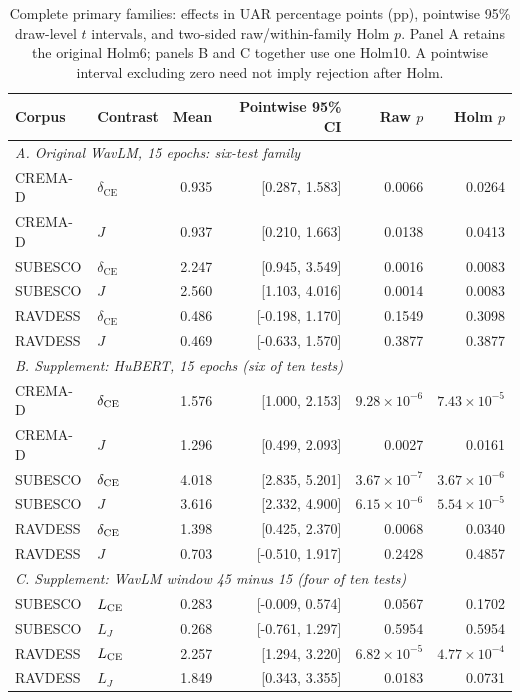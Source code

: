 \documentclass[letterpaper]{article}
\begin{document}
\begin{table}[t]
\centering\small
\caption{Complete primary families: effects in UAR percentage points (pp), pointwise 95\% draw-level $t$ intervals, and two-sided raw/within-family Holm $p$. Panel A retains the original Holm6; panels B and C together use one Holm10. A pointwise interval excluding zero need not imply rejection after Holm.}
\label{tab:primary}
\setlength{\tabcolsep}{5pt}
\begin{tabular}{llrrrr}\toprule
Corpus & Contrast & Mean & Pointwise 95\% CI & Raw $p$ & Holm $p$\\\midrule
\multicolumn{6}{l}{\textit{A. Original WavLM, 15 epochs: six-test family}}\\
CREMA-D & $\delta_{\mathrm{CE}}$ & 0.935 & [0.287, 1.583] & 0.0066 & 0.0264\\
CREMA-D & $J$ & 0.937 & [0.210, 1.663] & 0.0138 & 0.0413\\
SUBESCO & $\delta_{\mathrm{CE}}$ & 2.247 & [0.945, 3.549] & 0.0016 & 0.0083\\
SUBESCO & $J$ & 2.560 & [1.103, 4.016] & 0.0014 & 0.0083\\
RAVDESS & $\delta_{\mathrm{CE}}$ & 0.486 & [-0.198, 1.170] & 0.1549 & 0.3098\\
RAVDESS & $J$ & 0.469 & [-0.633, 1.570] & 0.3877 & 0.3877\\\midrule
\multicolumn{6}{l}{\textit{B. Supplement: HuBERT, 15 epochs (six of ten tests)}}\\
CREMA-D & $\delta_{\rm CE}$ & 1.576 & [1.000, 2.153] & $9.28\!\times\!10^{-6}$ & $7.43\!\times\!10^{-5}$\\
CREMA-D & $J$ & 1.296 & [0.499, 2.093] & 0.0027 & 0.0161\\
SUBESCO & $\delta_{\rm CE}$ & 4.018 & [2.835, 5.201] & $3.67\!\times\!10^{-7}$ & $3.67\!\times\!10^{-6}$\\
SUBESCO & $J$ & 3.616 & [2.332, 4.900] & $6.15\!\times\!10^{-6}$ & $5.54\!\times\!10^{-5}$\\
RAVDESS & $\delta_{\rm CE}$ & 1.398 & [0.425, 2.370] & 0.0068 & 0.0340\\
RAVDESS & $J$ & 0.703 & [-0.510, 1.917] & 0.2428 & 0.4857\\
\midrule
\multicolumn{6}{l}{\textit{C. Supplement: WavLM window 45 minus 15 (four of ten tests)}}\\
SUBESCO & $L_{\rm CE}$ & 0.283 & [-0.009, 0.574] & 0.0567 & 0.1702\\
SUBESCO & $L_J$ & 0.268 & [-0.761, 1.297] & 0.5954 & 0.5954\\
RAVDESS & $L_{\rm CE}$ & 2.257 & [1.294, 3.220] & $6.82\!\times\!10^{-5}$ & $4.77\!\times\!10^{-4}$\\
RAVDESS & $L_J$ & 1.849 & [0.343, 3.355] & 0.0183 & 0.0731\\
\bottomrule
\end{tabular}
\end{table}
\end{document}
